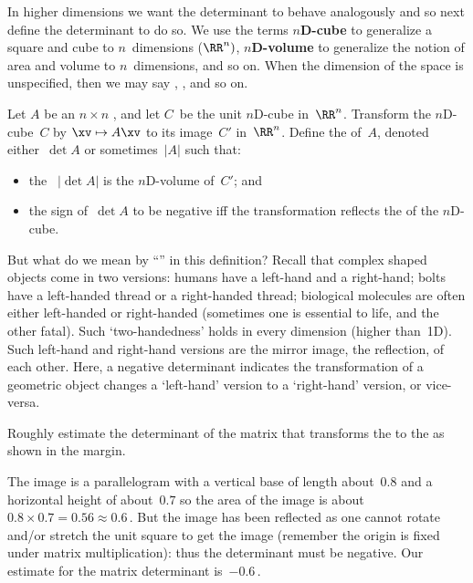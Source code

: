 In higher dimensions we want the determinant to behave analogously and so next define the determinant to do so.
We use the terms \textbf{$n$D-cube} to generalize a square and cube to \(n\)~dimensions (\(\RR^n)\), \textbf{$n$D-volume} to generalize the notion of area and volume to \(n\)~dimensions, and so on.
When the dimension of the space is unspecified, then we may say , , and so on.


\begin{definition} \label{def:detarea} 
Let \(A\) be an \(n\times n\) , and let \(C\)~be the unit $n$D-cube in~\(\RR^n\).
Transform the \(n\)D-cube~\(C\) by \(\xv\mapsto A\xv\)\index{$\mapsto$} to its image~\(C'\) in~\(\RR^n\). 
Define the  of~\(A\), denoted either~\(\det A\) or sometimes~\(|A|\) such that:  \begin{itemize}
\item the ~\(|\det A|\) is the $n$D-volume of~\(C'\); and 
\item the sign of~\(\det A\) to be negative iff the transformation reflects the  of the $n$D-cube.
\end{itemize}
\end{definition}

But what do we mean by ``'' in this definition?
Recall that complex shaped objects come in two versions: humans have a left-hand and a right-hand; bolts have a left-handed thread or a right-handed thread; biological molecules are often either left-handed or right-handed (sometimes one is essential to life, and the other fatal).
Such `two-handedness' holds in every dimension (higher than~1D).
Such left-hand and right-hand versions are the mirror image, the reflection, of each other.
Here, a negative determinant indicates the transformation of a geometric object changes a `left-hand' version to a `right-hand' version, or vice-versa.


\begin{example} 
Roughly estimate the determinant of the matrix that transforms the  to the  as shown in the margin.
\begin{solution} 
The image is a parallelogram with a vertical base of length about~\(0.8\) and a horizontal height of about~\(0.7\) so the area of the image is about~\(0.8\times0.7=0.56\approx 0.6\)\,.
But the image has been reflected as one cannot rotate and/or stretch the unit square to get the image (remember the origin is fixed under matrix multiplication): thus the determinant must be negative.
Our estimate for the matrix determinant is~\(-0.6\)\,.
\end{solution}
\end{example}



